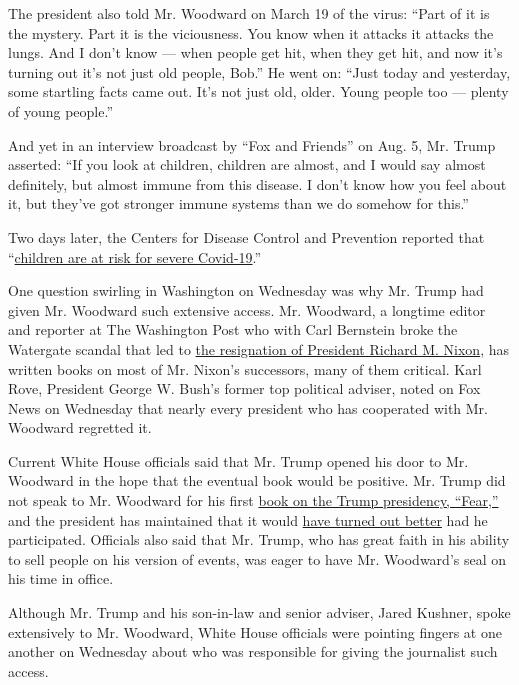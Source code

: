The president also told Mr. Woodward on March 19 of the virus: ``Part of
it is the mystery. Part it is the viciousness. You know when it attacks
it attacks the lungs. And I don't know --- when people get hit, when
they get hit, and now it's turning out it's not just old people, Bob.''
He went on: ``Just today and yesterday, some startling facts came out.
It's not just old, older. Young people too --- plenty of young people.''

And yet in an interview broadcast by ``Fox and Friends'' on Aug. 5, Mr.
Trump asserted: ``If you look at children, children are almost, and I
would say almost definitely, but almost immune from this disease. I
don't know how you feel about it, but they've got stronger immune
systems than we do somehow for this.''

Two days later, the Centers for Disease Control and Prevention reported
that
``\href{https://www.cdc.gov/mmwr/volumes/69/wr/mm6932e3.htm}{children
are at risk for severe Covid-19}.''

One question swirling in Washington on Wednesday was why Mr. Trump had
given Mr. Woodward such extensive access. Mr. Woodward, a longtime
editor and reporter at The Washington Post who with Carl Bernstein broke
the Watergate scandal that led to
\href{https://www.nytimes3xbfgragh.onion/1974/08/09/archives/the-37th-president-is-first-to-quit-post-speaks-of-pain-at-yielding.html}{the
resignation of President Richard M. Nixon}, has written books on most of
Mr. Nixon's successors, many of them critical. Karl Rove, President
George W. Bush's former top political adviser, noted on Fox News on
Wednesday that nearly every president who has cooperated with Mr.
Woodward regretted it.

Current White House officials said that Mr. Trump opened his door to Mr.
Woodward in the hope that the eventual book would be positive. Mr. Trump
did not speak to Mr. Woodward for his first
\href{https://www.nytimes3xbfgragh.onion/2018/09/05/books/review-fear-trump-in-white-house-bob-woodward.html}{book
on the Trump presidency, ``Fear,''} and the president has maintained
that it would
\href{https://www.nytimes3xbfgragh.onion/2018/09/04/us/politics/trump-woodward-book-fear.html}{have
turned out better} had he participated. Officials also said that Mr.
Trump, who has great faith in his ability to sell people on his version
of events, was eager to have Mr. Woodward's seal on his time in office.

Although Mr. Trump and his son-in-law and senior adviser, Jared Kushner,
spoke extensively to Mr. Woodward, White House officials were pointing
fingers at one another on Wednesday about who was responsible for giving
the journalist such access.

